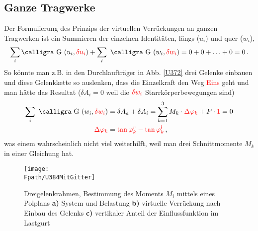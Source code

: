 {{{{%
{\textcolor{sectionTitleBlue}{\section{Ganze Tragwerke}}}
Der Formulierung des Prinzips der virtuellen Verr\"{u}ckungen an ganzen Tragwerken ist ein Summieren der einzelnen Identit\"{a}ten, l\"{a}ngs ($u_i$) und quer ($w_i$),
\begin{align}
\sum_i \text{\normalfont\calligra G\,\,}(u_i,\textcolor{red}{\delta u_i}) + \sum_i\ \text{\normalfont\calligra G\,\,}(w_i,\textcolor{red}{\delta w_i}) = 0 + 0 + \ldots + 0 = 0\,.
\end{align}
So k\"{o}nnte man z.B. in den Durchlauftr\"{a}ger in Abb. \ref{U372} drei Gelenke einbauen und diese Gelenkkette so auslenken, dass die Einzelkraft den Weg \textcolor{red}{Eins} geht und man h\"{a}tte das Resultat ($\delta A_i = 0$ weil die $\textcolor{red}{\delta w_i}$ Starrk\"{o}rperbewegungen sind)
\begin{align}\label{Eq73}
\sum_i\ \text{\normalfont\calligra G\,\,}(w_i,\textcolor{red}{\delta w_i}) &= \delta A_a + \delta A_i = \sum_{k = 1}^3 M_k \cdot \textcolor{red}{\Delta \Np_k} + P \cdot \textcolor{red}{1} = 0 \\
 \textcolor{red}{\Delta \Np_k} &= \textcolor{red}{\tan \Np_k^r - \tan \Np_k^l}\,,
\end{align}
was einem wahrscheinlich nicht viel weiterhilft, weil man drei Schnittmomente $M_k$ in einer Gleichung hat.
\begin{figure}[tbp]
\centering
\if {} \sidecaption \fi
\texttt{[image: \\Fpath/U384MitGitter]}
\caption{Dreigelenkrahmen, Bestimmung des Moments $M_i$ mittels eines Polplans \textbf{ a)} System und Belastung  \textbf{b)} virtuelle Verr\"{u}ckung nach Einbau des Gelenks  \textbf{c)} vertikaler Anteil der Einflussfunktion im Lastgurt} \label{U384}
\end{figure}%

}}}}
